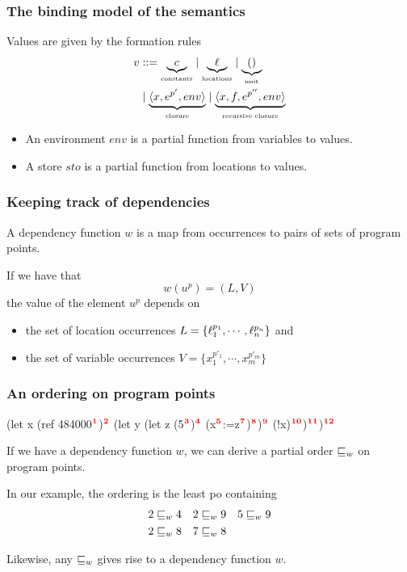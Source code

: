\documentclass{beamer}
\begin{document}
\begin{frame}
  \frametitle{The binding model of the semantics}

  Values are given by the formation rules
%
  \begin{align*}
    v & ::= \underbrace{c}_{\text{\tiny{constants}}} \mid \underbrace{\ell}_{\text{\tiny{locations}}} \mid
        \underbrace{()}_{\text{\tiny{unit}}} \\
    & \mid  \underbrace{\langle x,e^{p'},env\rangle}_{\text{\tiny{closure}}} \mid
      \underbrace{\langle x,f,e^{p''},env\rangle}_{\text{\tiny{recursive closure}}}
   \end{align*}

   \begin{itemize}
   \item An environment $env$ is a partial function from variables to values.
\item A store $sto$ is a partial function from locations to values.
   \end{itemize}

\end{frame}
\begin{frame} \frametitle{Keeping track of dependencies}

  A dependency function $w$ is a map from occurrences to pairs of sets
  of program points.
  
  If we have that
\[ w (u^p)=(L,V) \]
%
the value of the element $u^p$ depends on
\begin{itemize}
\item the set of location occurrences
  $L=\{\ell_1^{p_1},\cdots,\ell_n^{p_n}\}$ and
\item the set of variable occurrences $V =\{x_1^{p'_1},\cdots,x_m^{p'_m}\}$

\end{itemize}

\end{frame}

\begin{frame}[fragile]
  \frametitle{An ordering on program points}

   \begin{rescript}
   (let x (ref 484000$\mathbf{\textcolor{red}{^{1}}}$)$\mathbf{\textcolor{red}{^{2}}}$
     (let y (let z (5$\mathbf{\textcolor{red}{^{3}}}$)$\mathbf{\textcolor{red}{^{4}}}$
        (x$\mathbf{\textcolor{red}{^{5}}}$:=z$\mathbf{\textcolor{red}{^{7}}}$)$\mathbf{\textcolor{red}{^{8}}}$)$\mathbf{\textcolor{red}{^{9}}}$ (!x)$\mathbf{\textcolor{red}{^{10}}}$)$\mathbf{\textcolor{red}{^{11}}}$)$\mathbf{\textcolor{red}{^{12}}}$
\end{rescript}

      If we have a dependency function $w$, we can derive a partial order $\sqsubseteq_w$ on
      program points.

      In our example, the ordering is the least po containing
%
      \begin{align*}
        2 \sqsubseteq_w 4 && 2 \sqsubseteq_w 9 && 5 \sqsubseteq_w 9 \\
        2 \sqsubseteq_w 8 && 7 \sqsubseteq_w 8
      \end{align*}

      Likewise, any $\sqsubseteq_w$ gives rise to a dependency function $w$.
\end{frame}
\end{document}
